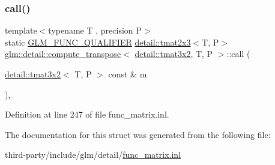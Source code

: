 \subsubsection{\texorpdfstring{call()}{call()}}
{\footnotesize\ttfamily template$<$typename T , precision P$>$ \\
static \hyperlink{setup_8hpp_a33fdea6f91c5f834105f7415e2a64407}{G\+L\+M\+\_\+\+F\+U\+N\+C\+\_\+\+Q\+U\+A\+L\+I\+F\+I\+ER} \hyperlink{structglm_1_1detail_1_1tmat2x3}{detail\+::tmat2x3}$<$T, P$>$ \hyperlink{structglm_1_1detail_1_1compute__transpose}{glm\+::detail\+::compute\+\_\+transpose}$<$ \hyperlink{structglm_1_1detail_1_1tmat3x2}{detail\+::tmat3x2}, T, P $>$\+::call (\begin{DoxyParamCaption}\item[{\hyperlink{structglm_1_1detail_1_1tmat3x2}{detail\+::tmat3x2}$<$ T, P $>$ const \&}]{m }\end{DoxyParamCaption})\hspace{0.3cm}{\ttfamily [inline]}, {\ttfamily [static]}}



Definition at line 247 of file func\+\_\+matrix.\+inl.



The documentation for this struct was generated from the following file\+:\begin{DoxyCompactItemize}
\item 
third-\/party/include/glm/detail/\hyperlink{func__matrix_8inl}{func\+\_\+matrix.\+inl}\end{DoxyCompactItemize}
